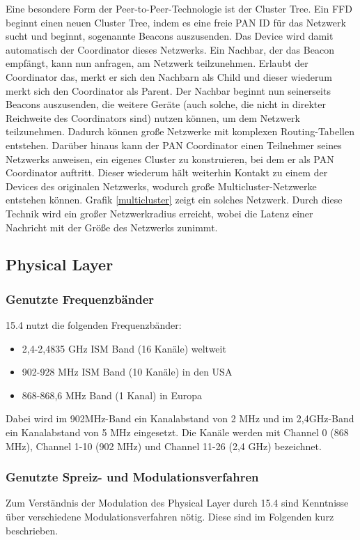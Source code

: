Eine besondere Form der Peer-to-Peer-Technologie ist der Cluster Tree. Ein FFD beginnt einen neuen Cluster Tree, indem es eine freie PAN ID für das Netzwerk sucht und beginnt, sogenannte Beacons auszusenden. Das Device wird damit automatisch der Coordinator dieses Netzwerks. Ein Nachbar, der das Beacon empfängt, kann nun anfragen, am Netzwerk teilzunehmen. Erlaubt der Coordinator das, merkt er sich den Nachbarn als Child und dieser wiederum merkt sich den Coordinator als Parent. Der Nachbar beginnt nun seinerseits Beacons auszusenden, die weitere Geräte (auch solche, die nicht in direkter Reichweite des Coordinators sind) nutzen können, um dem Netzwerk teilzunehmen. Dadurch können große Netzwerke mit komplexen Routing-Tabellen entstehen. Darüber hinaus kann der PAN Coordinator einen Teilnehmer seines Netzwerks anweisen, ein eigenes Cluster zu konstruieren, bei dem er als PAN Coordinator auftritt. Dieser wiederum hält weiterhin Kontakt zu einem der Devices des originalen Netzwerks, wodurch große Multicluster-Netzwerke entstehen können. Grafik \ref{multicluster} zeigt ein solches Netzwerk. Durch diese Technik wird ein großer Netzwerkradius erreicht, wobei die Latenz einer Nachricht mit der Größe des Netzwerks zunimmt.\\

\subsection{Physical Layer}
\subsubsection{Genutzte Frequenzbänder}
15.4 nutzt die folgenden Frequenzbänder:
\begin{itemize}
	\item 2,4-2,4835 GHz ISM Band (16 Kanäle) weltweit
	\item 902-928 MHz ISM Band (10 Kanäle) in den USA
	\item 868-868,6 MHz Band (1 Kanal) in Europa
\end{itemize}
Dabei wird im 902MHz-Band ein Kanalabstand von 2 MHz und im 2,4GHz-Band ein Kanalabstand von 5 MHz eingesetzt. Die Kanäle werden mit Channel 0 (868 MHz), Channel 1-10 (902 MHz) und Channel 11-26 (2,4 GHz) bezeichnet.
\subsubsection{Genutzte Spreiz- und Modulationsverfahren}
Zum Verständnis der Modulation des Physical Layer durch 15.4 sind Kenntnisse über verschiedene Modulationsverfahren nötig. Diese sind im Folgenden kurz beschrieben. \\

